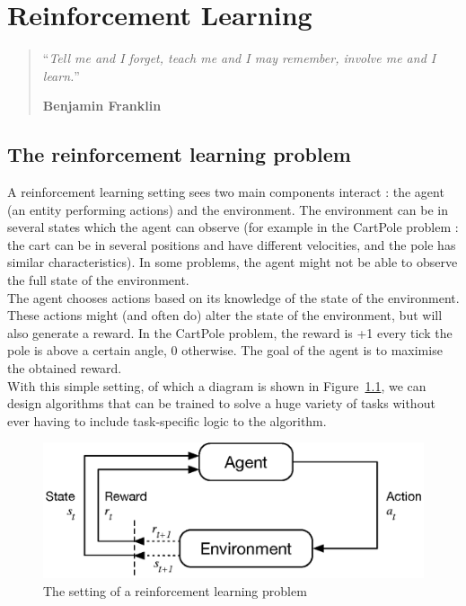 \chapter{Reinforcement Learning}
\begin{quotation}
\noindent ``\emph{Tell me and I forget, teach me and I may remember, involve me
	and I learn.}''
\begin{flushright}\textbf{Benjamin Franklin}\end{flushright}
\end{quotation}

\vspace*{0.5cm}


\section{The reinforcement learning problem}
A reinforcement learning setting sees two main components interact : the agent
(an entity performing actions)
and the environment. The environment can be in several states which the agent
can observe (for example in the CartPole problem : the cart can be in several 
positions and have different velocities, and the pole has similar 
characteristics). In some problems, the agent might not be able to observe the
full state of the environment.\\

The agent chooses actions based on its knowledge of the state of the
environment. These actions might (and often do) alter the state of the
environment, but will also generate a reward. In the CartPole problem, the 
reward is +1 every tick the pole is above a certain angle, 0 otherwise. The
goal of the agent is to maximise the obtained reward.\\

With this simple setting, of which a diagram is shown in Figure~\ref{fig:rl},
we can design algorithms that can be trained to solve a huge variety of tasks
without ever having to include task-specific logic to the algorithm.

\begin{figure}[]
	\centering
	\includegraphics[width=0.65\linewidth]{fig/rl.eps}
	\caption{The setting of a reinforcement learning problem 
		\cite{suttonbarto}}
	\label{fig:rl}
\end{figure}

